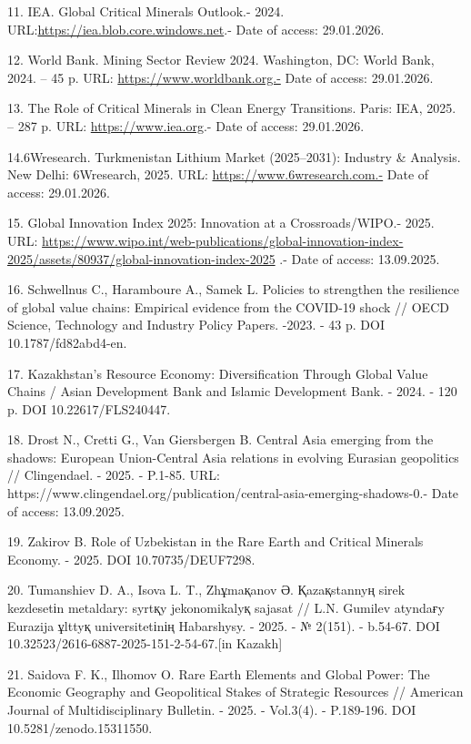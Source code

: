 \begin{refs}
11. IEA. Global Critical Minerals Outlook.- 2024.
URL:\href{https://iea.blob.core.windows.net/assets/ee01701d-1d5c-4ba8-9df6-abeeac9de99a/GlobalCriticalMineralsOutlook2024.pdf}{https://iea.blob.core.windows.net}.- Date of access: 29.01.2026.

12. World Bank. Mining Sector Review 2024. Washington, DC: World Bank,
2024. -- 45 p. URL: \url{https://www.worldbank.org.-} Date of access:
29.01.2026.

13. The Role of Critical Minerals in Clean Energy Transitions. Paris:
IEA, 2025. -- 287 p. URL:
\href{https://www.iea.org/reports/the-role-of-critical-minerals-in-clean-energy-transitions}{https://www.iea.org}.-
Date of access: 29.01.2026.

14.6Wresearch. Turkmenistan Lithium Market (2025--2031): Industry \&
Analysis. New Delhi: 6Wresearch, 2025. URL:
\url{https://www.6wresearch.com.-} Date of access: 29.01.2026.

15. Global Innovation Index 2025: Innovation at a Crossroads/WIPO.- 2025.
URL:
\url{https://www.wipo.int/web-publications/global-innovation-index-2025/assets/80937/global-innovation-index-2025} .-
Date of access: 13.09.2025.

16. Schwellnus C., Haramboure A., Samek L. Policies to strengthen the
resilience of global value chains: Empirical evidence from the COVID-19
shock // OECD Science, Technology and Industry Policy Papers. -2023. -
43 p. DOI 10.1787/fd82abd4-en.

17. Kazakhstan's Resource Economy: Diversification Through Global Value
Chains / Asian Development Bank and Islamic Development Bank. - 2024. -
120 p. DOI 10.22617/FLS240447.

18. Drost N., Cretti G., Van Giersbergen B. Central Asia emerging from
the shadows: European Union-Central Asia relations in evolving Eurasian
geopolitics // Clingendael. - 2025. - P.1-85. URL:
https://www.clingendael.org/publication/central-asia-emerging-shadows-0.-
Date of access: 13.09.2025.

19. Zakirov B. Role of Uzbekistan in the Rare Earth and Critical
Minerals Economy. - 2025. DOI 10.70735/DEUF7298.

20. Tumanshiev D. A., Isova L. T., Zhұmaқanov Ә. Қazaқstannyң sirek
kezdesetіn metaldary: syrtқy jekonomikalyқ sajasat // L.N. Gumilev
atyndaғy Eurazija ұlttyқ universitetіnің Habarshysy. - 2025. - № 2(151).
- b.54-67. DOI 10.32523/2616-6887-2025-151-2-54-67.{[}in Kazakh{]}

21. Saidova F. K., Ilhomov O. Rare Earth Elements and Global Power: The
Economic Geography and Geopolitical Stakes of Strategic Resources //
American Journal of Multidisciplinary Bulletin. - 2025. - Vol.3(4). -
P.189-196. DOI 10.5281/zenodo.15311550.
\end{refs}


